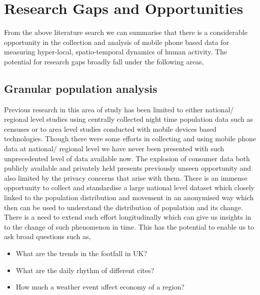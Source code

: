 \section{Research Gaps and Opportunities}

From the above literature search we can summarise that there is a considerable opportunity in the collection and analysis of mobile phone based data for measuring hyper-local, spatio-temporal dynamics of human activity.
The potential for research gaps broadly fall under the following areas,

\subsection{Granular population analysis}


Previous research in this area of study has been limited to either national/ regional level studies using centrally collected night time population data such as censuses or to area level studies conducted with mobile devices based technologies.
Though there were some efforts in collecting and using mobile phone data at national/ regional level we have never been presented with such unprecedented level of data available now.
The explosion of consumer data both publicly available and privately held presents previously unseen opportunity and also limited by the privacy concerns that arise with them.
There is an immense opportunity to collect and standardise a large national level dataset which closely linked to the population distribution and movement in an anonymised way which then can be used to understand the distribution of population and its change.
There is a need to extend such effort  longitudinally which can give us insights in to the change of such phenomenon in time.
This has the potential to enable us to ask broad questions such as,

\begin{itemize}
  \setlength{\itemindent}{2em}
  \itemsep-0.25em
  \item What are the trends in the footfall in UK?
  \item What are the daily rhythm of different cites?
  \item How much a weather event affect economy of a region?
\end{itemize}

